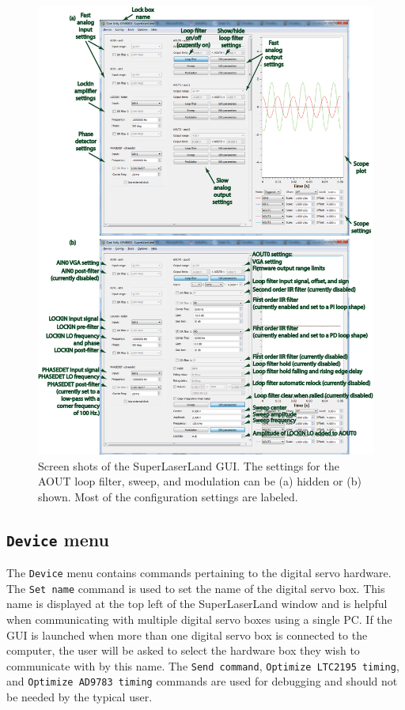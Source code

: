 \documentclass[aip,rsi,preprint,graphicx]{revtex4-1}
\begin{document}
\begin{figure}
\begin{center}
\includegraphics[width=1.0\textwidth]{Figs/SuperlaserlandOverview}
\caption{\label{fig:SoftwareScreenshot}Screen shots of the SuperLaserLand GUI.  The settings for the AOUT loop filter, sweep, and modulation can be (a) hidden or (b) shown.  Most of the configuration settings are labeled.}
\end{center}
\end{figure}

\subsection{{\tt Device} menu}

The {\tt Device} menu contains commands pertaining to the digital servo hardware.  The {\tt Set name} command is used to set the name of the digital servo box.  This name is displayed at the top left of the SuperLaserLand window and is helpful when communicating with multiple digital servo boxes using a single PC.  If the GUI is launched when more than one digital servo box is connected to the computer, the user will be asked to select the hardware box they wish to communicate with by this name.  The {\tt Send command}, {\tt Optimize LTC2195 timing}, and {\tt Optimize AD9783 timing} commands are used for debugging and should not be needed by the typical user.
\end{document}
